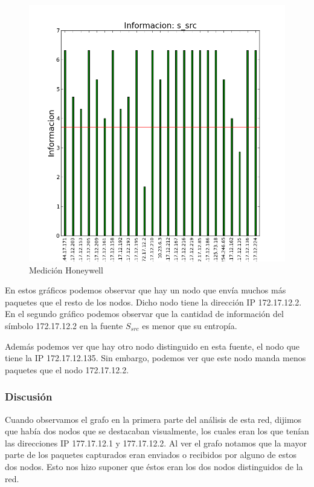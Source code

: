 \begin{figure}[H]
\begin{minipage}{0.5\linewidth}
     \includegraphics[width=\linewidth]{../imgs/snifAlto-ips_s_src_info.png}
     \caption{Medición Honeywell}\label{fig:Alto-src-info}
   \end{minipage}
 \end{figure}

En estos gráficos podemos observar que hay un nodo que envía muchos más paquetes que el resto de los nodos. Dicho nodo tiene la dirección IP 172.17.12.2. En el segundo gráfico podemos observar que la cantidad de información del símbolo 172.17.12.2 en la fuente $S_{src}$ es menor que su entropía.

Además podemos ver que hay otro nodo distinguido en esta fuente, el nodo que tiene la IP 172.17.12.135. Sin embargo, podemos ver que este nodo manda menos paquetes que el nodo 172.17.12.2.
 
\subsubsection{Discusión}

Cuando observamos el grafo en la primera parte del análisis de esta red, dijimos que había dos nodos que se destacaban visualmente, los cuales eran los que tenían las direcciones IP 177.17.12.1 y 177.17.12.2. Al ver el grafo notamos que la mayor parte de los paquetes capturados eran enviados o recibidos por alguno de estos dos nodos. Esto nos hizo suponer que éstos eran los dos nodos distinguidos de la red.

